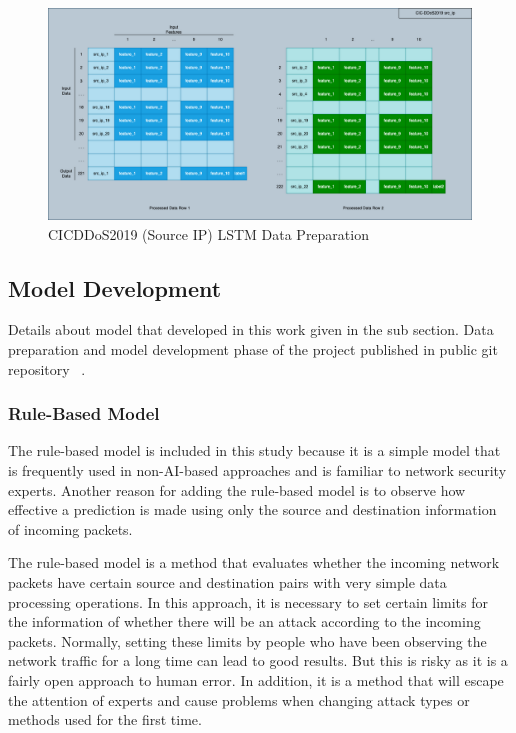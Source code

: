 \documentclass{article}
\begin{document}
\begin{figure}
  \centering
  \includegraphics[width=\textwidth]{cicddos2019_lstm.png}
  \caption{CICDDoS2019 (Source IP) LSTM Data Preparation}
  \label{cicddos2019-lstm}
\end{figure}

\subsection{Model Development}
Details about model that developed in this work given in the sub section. Data preparation and model development phase of the project published in public git repository ~\cite{ozgunk}.

\subsubsection{Rule-Based Model}

The rule-based model is included in this study because it is a simple model that is frequently used in non-AI-based approaches and is familiar to network security experts. Another reason for adding the rule-based model is to observe how effective a prediction is made using only the source and destination information of incoming packets. 

The rule-based model is a method that evaluates whether the incoming network packets have certain source and destination pairs with very simple data processing operations. In this approach, it is necessary to set certain limits for the information of whether there will be an attack according to the incoming packets. Normally, setting these limits by people who have been observing the network traffic for a long time can lead to good results. But this is risky as it is a fairly open approach to human error. In addition, it is a method that will escape the attention of experts and cause problems when changing attack types or methods used for the first time. 
\end{document}
